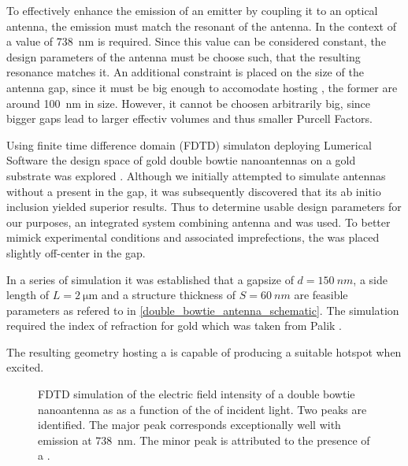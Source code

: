		To effectively enhance the emission of an emitter by coupling it to an optical antenna, the emission \wl must match the resonant \wl of the antenna. In the context of \sivs a value of \SI{738}{nm} is required. Since this value can be considered constant, the design parameters of the antenna must be choose such, that the resulting resonance matches it. An additional constraint is placed on the size of the antenna gap, since it must be big enough to accomodate \nds hosting \sivs, the former are around \SI{100}{\nm} in size. However, it cannot be choosen arbitrarily big, since bigger gaps lead to larger effectiv volumes and thus smaller Purcell Factors.

		Using finite time difference domain (FDTD) simulaton deploying Lumerical Software the design space of gold double bowtie nanoantennas on a gold substrate was explored \cite{nancy::thesis}. Although we initially attempted to simulate antennas without a \nd present in the gap, it was subsequently discovered that its ab initio inclusion yielded superior results. Thus to determine usable design parameters for our purposes, an integrated system combining antenna and \nd was used. To better mimick experimental conditions and associated imprefections, the \nd was placed slightly off-center in the gap.

		In a series of simulation it was established that a gapsize of $d = \SI{150}{nm}$, a side length of $L = \SI{2}{\micro\meter}$ and a structure thickness of $S = \SI{60}{nm}$ are feasible parameters as refered to in \autoref{double_bowtie_antenna_schematic}. The simulation required the index of refraction for gold which was taken from Palik \cite{Palik, E. D. Handbook of optical constants of solids. 3, (Academic press, 1998)}.

		The resulting geometry hosting a \nd is capable of producing a suitable hotspot when excited.

		\begin{figure}[htp]
				\centering
			\caption[Simulation of the resonance spectrum of a double bowtie antenna]{FDTD simulation of the electric field intensity of a double bowtie nanoantenna as as a function of the \wl of incident light. Two peaks are identified. The major peak corresponds exceptionally well with \siv emission at \SI{738}{nm}. The minor peak is attributed to the presence of a \nd.}
			\label{fig::antenna_fdtd_spectrum}
		\end{figure}

